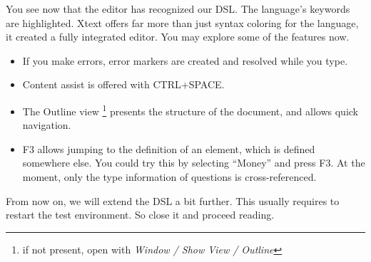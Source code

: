 You see now that the editor has recognized our DSL. The language's keywords are
highlighted. Xtext offers far more than just syntax coloring for the language,
it created a fully integrated editor. You may explore some of the features now.

\begin{itemize}
  \item If you make errors, error markers are created and resolved while
you type.
\item Content assist is offered with CTRL+SPACE.
\item The Outline view \footnote{if not present, open with \emph{Window / Show View /
Outline}} presents the structure of the document, and allows quick navigation.
\item F3 allows jumping to the definition of an element, which is defined
somewhere else. You could try this by selecting ``Money'' and press F3. At the
moment, only the type information of questions is cross-referenced.
\end{itemize}

From now on, we will extend the DSL a bit further. This usually requires to
restart the test environment. So close it and proceed reading.
